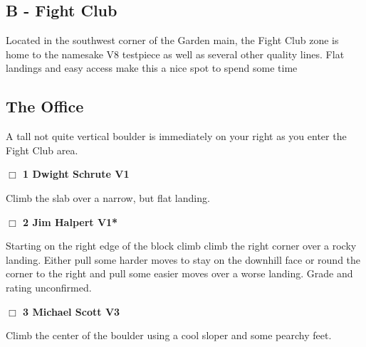 	\begin{multicols}{2}


\section{B - Fight Club}\label{sa:Fight Club}
Located in the southwest corner of the Garden main, the Fight Club zone is home to the namesake V8 testpiece as well as several other quality lines. Flat landings and easy access make this a nice spot to spend some time\\




\needspace{1.5cm}
\subsection*{The Office}\label{bf:The Office}
A tall not quite vertical boulder is immediately on your right as you enter the Fight Club area.\\
	


\needspace{1.5cm}
\label{rt:Dwight Schrute}
\colorbox{green!20}{
\parbox{0.95\linewidth}{
\hspace{-1ex}\textbf{$\Box$
1 Dwight Schrute V1  \warn
}}}
\begin{adjustwidth}{1.3em}{}			
Climb the slab over a narrow, but flat landing.
\end{adjustwidth}




\needspace{1.5cm}
\label{rt:Jim Halpert}
\colorbox{green!20}{
\parbox{0.95\linewidth}{
\hspace{-1ex}\textbf{$\Box$
2 Jim Halpert V1*  \warn\warn
}}}
\begin{adjustwidth}{1.3em}{}			
Starting on the right edge of the block climb climb the right corner over a rocky landing. Either pull some harder moves to stay on the downhill face or round the corner to the right and pull some easier moves over a worse landing. Grade and rating unconfirmed.
\end{adjustwidth}




\needspace{1.5cm}
\label{rt:Michael Scott}
\colorbox{green!20}{
\parbox{0.95\linewidth}{
\hspace{-1ex}\textbf{$\Box$
3 Michael Scott V3  \warn
}}}
\begin{adjustwidth}{1.3em}{}			
Climb the center of the boulder using a cool sloper and some pearchy feet.
\end{adjustwidth}





\end{multicols}
